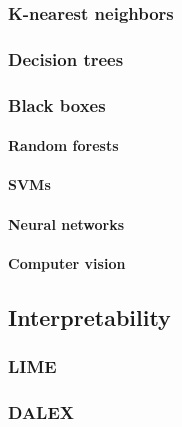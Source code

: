 \documentclass[
]{book}
\begin{document}
\hypertarget{k-nearest-neighbors}{%
\subsubsection{K-nearest neighbors}\label{k-nearest-neighbors}}

\hypertarget{decision-trees}{%
\subsubsection{Decision trees}\label{decision-trees}}

\hypertarget{black-boxes}{%
\subsubsection{Black boxes}\label{black-boxes}}

\hypertarget{random-forests}{%
\paragraph{Random forests}\label{random-forests}}

\hypertarget{svms}{%
\paragraph{SVMs}\label{svms}}

\hypertarget{neural-networks}{%
\paragraph{Neural networks}\label{neural-networks}}

\hypertarget{computer-vision}{%
\paragraph{Computer vision}\label{computer-vision}}

\hypertarget{interpretability}{%
\subsection{Interpretability}\label{interpretability}}

\hypertarget{lime}{%
\subsubsection{LIME}\label{lime}}

\hypertarget{dalex}{%
\subsubsection{DALEX}\label{dalex}}
\end{document}
